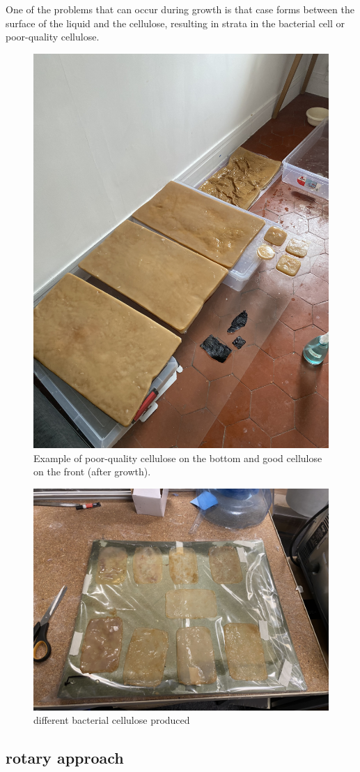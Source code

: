 One of the problems that can occur during growth is that case forms between the surface of the liquid and the cellulose, resulting in strata in the bacterial cell or poor-quality cellulose. 
\begin{figure}[h]
    \centering
    \includegraphics{images/IMG_3944.jpg}
    \caption{Example of poor-quality cellulose on the bottom and good cellulose on the front (after growth). }
    \label{fig:rotary inside}
\end{figure} 

\begin{figure}[h]
    \centering
    \includegraphics{images/IMG_4567.jpg}
    \caption{different bacterial cellulose produced}
    \label{fig:rotary inside}
\end{figure} 

\subsection{rotary approach}



